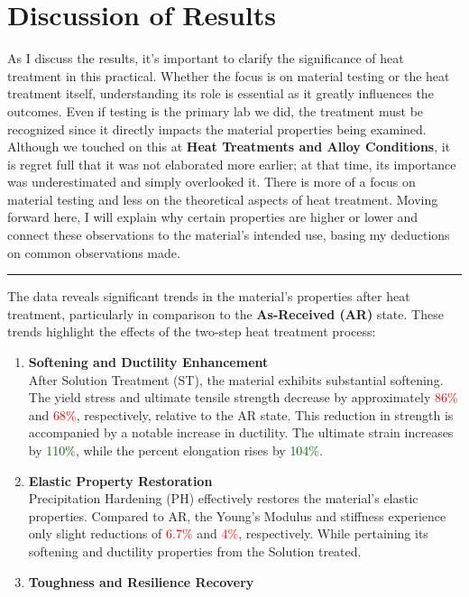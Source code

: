 \documentclass{article}
\begin{document}
{    \section{Discussion of Results}\label{discuss}
    As I discuss the results, it's important to clarify the significance of heat treatment in this practical. Whether the focus is on material testing or the heat treatment itself, understanding its role is essential as it greatly influences the outcomes. Even if testing is the primary lab we did, the treatment must be recognized since it directly impacts the material properties being examined. Although we touched on this at \textbf{Heat Treatments and Alloy Conditions}, it is regret full that it was not elaborated more earlier; at that time, its importance was underestimated and simply overlooked it. There is more of a focus on material testing and less on the theoretical aspects of heat treatment. Moving forward here, I will explain why certain properties are higher or lower and connect these observations to the material's intended use, basing my deductions on common observations made.\\[1em]
    \hrule\vspace{1em}
    The data reveals significant trends in the material's properties after heat treatment, particularly in comparison to the \textbf{As-Received (AR)} state. These trends highlight the effects of the two-step heat treatment process:
\begin{enumerate}[itemsep=-1mm]
    \item \textbf{Softening and Ductility Enhancement}\\
    After Solution Treatment (ST), the material exhibits substantial softening. The yield stress and ultimate tensile strength decrease by approximately \textcolor{red}{86\%} and \textcolor{red}{68\%}, respectively, relative to the AR state. This reduction in strength is accompanied by a notable increase in ductility. The ultimate strain increases by \textcolor{darkgreen}{110\%}, while the percent elongation rises by \textcolor{darkgreen}{104\%}.
    \item \textbf{Elastic Property Restoration}\\
    Precipitation Hardening (PH) effectively restores the material's elastic properties. Compared to AR, the Young’s Modulus and stiffness experience only slight reductions of \textcolor{red}{6.7\%} and \textcolor{red}{4\%}, respectively. While pertaining its softening and ductility properties from the Solution treated.
    \item \textbf{Toughness and Resilience Recovery}\\

\end{enumerate}}
\end{document}
